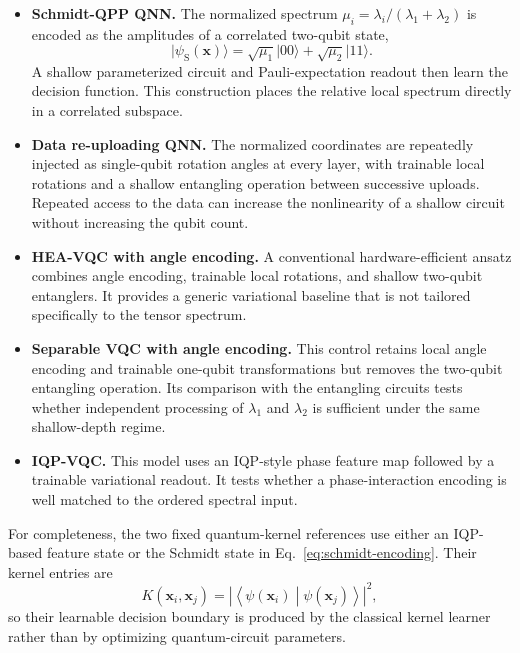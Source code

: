 \documentclass[11pt]{article}
\begin{document}
\begin{itemize}
    \item \textbf{Schmidt-QPP QNN.}  The normalized spectrum
    $\mu_i=\lambda_i/(\lambda_1+\lambda_2)$ is encoded as the amplitudes of a
    correlated two-qubit state,
    \begin{equation}
        \lvert\psi_{\mathrm{S}}(\boldsymbol{x})\rangle
        =\sqrt{\mu_1}\lvert 00\rangle+\sqrt{\mu_2}\lvert 11\rangle.
        \label{eq:schmidt-encoding}
    \end{equation}
    A shallow parameterized circuit and Pauli-expectation readout then learn
    the decision function.  This construction places the relative local
    spectrum directly in a correlated subspace.

    \item \textbf{Data re-uploading QNN.}  The normalized coordinates are
    repeatedly injected as single-qubit rotation angles at every layer, with
    trainable local rotations and a shallow entangling operation between
    successive uploads.  Repeated access to the data can increase the
    nonlinearity of a shallow circuit without increasing the qubit count.

    \item \textbf{HEA-VQC with angle encoding.}  A conventional
    hardware-efficient ansatz combines angle encoding, trainable local
    rotations, and shallow two-qubit entanglers.  It provides a generic
    variational baseline that is not tailored specifically to the tensor
    spectrum.

    \item \textbf{Separable VQC with angle encoding.}  This control retains
    local angle encoding and trainable one-qubit transformations but removes
    the two-qubit entangling operation.  Its comparison with the entangling
    circuits tests whether independent processing of $\lambda_1$ and
    $\lambda_2$ is sufficient under the same shallow-depth regime.

    \item \textbf{IQP-VQC.}  This model uses an IQP-style phase feature map
    followed by a trainable variational readout.  It tests whether a
    phase-interaction encoding is well matched to the ordered spectral input.
\end{itemize}

For completeness, the two fixed quantum-kernel references use either an
IQP-based feature state or the Schmidt state in
Eq.~\eqref{eq:schmidt-encoding}.  Their kernel entries are
\begin{equation}
    K(\boldsymbol{x}_i,\boldsymbol{x}_j)
    =\left|\left\langle\psi(\boldsymbol{x}_i)
      \middle|\psi(\boldsymbol{x}_j)\right\rangle\right|^2,
    \label{eq:fidelity-kernel}
\end{equation}
so their learnable decision boundary is produced by the classical kernel
learner rather than by optimizing quantum-circuit parameters.
\end{document}
